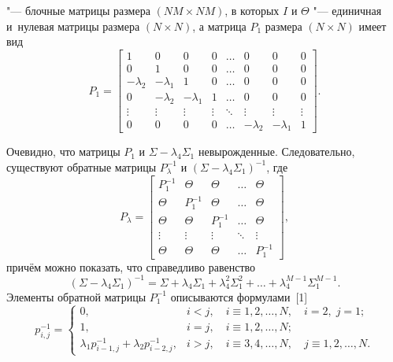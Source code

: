 "--- блочные матрицы размера $(NM{\times }NM)$, в которых $I$ и $\Theta$ "---
единичная и~нулевая матрицы размера $(N{\times} N)$, а матрица $P_1$ размера $(N{\times} N)$ имеет вид
\[
P_1= \begin{bmatrix}
1 & 0 & 0 & 0 & \ldots & 0 & 0 & 0 \\
0 & 1 & 0 & 0 & \ldots & 0 & 0 & 0\\
-\lambda_2 & -\lambda_1 & 1 & 0 & \ldots & 0 & 0 & 0 \\
0 & -\lambda_2 & -\lambda_1 & 1 & \ldots & 0 & 0 & 0\\
\vdots & \vdots & \vdots & \vdots & \ddots & \vdots & \vdots & \vdots\\
0 & 0 & 0 & 0 & \ldots & -\lambda_2 & -\lambda_1 & 1
\end{bmatrix}.
\]

Очевидно, что матрицы $P_1$ и $\Sigma-\lambda_4\Sigma_1$ невырожденные. Следовательно, существуют обратные матрицы $P_\lambda^{-1}$ и $(\Sigma-\lambda_4\Sigma_1)^{-1}$, где
\[
P_\lambda= \begin{bmatrix}
P_1^{-1} & \Theta & \Theta & \ldots & \Theta \\
\Theta & P_1^{-1} & \Theta & \ldots & \Theta\\
\Theta & \Theta & P_1^{-1} & \ldots & \Theta \\
\vdots & \vdots & \vdots & \ddots & \vdots\\
\Theta & \Theta & \Theta & \ldots & P_1^{-1}
\end{bmatrix},
\]
причём можно показать, что справедливо равенство $$(\Sigma-\lambda_4\Sigma_1)^{-1}=\Sigma+\lambda_4\Sigma_1+\lambda_4^{2}\Sigma_1^{2}+\ldots+\lambda_4^{M-1}\Sigma_1^{M-1}.$$ Элементы обратной матрицы $P_1^{-1}$ описываются формулами~[1]
\[ p_{i,j}^{-1}=\left\{
\begin{array}{cl}
0, & i<j, \quad i\equiv1, 2,\ldots,N, \quad i=2,\;j=1;\\
1, & i=j,\quad i\equiv1, 2,\ldots,N;\\
\lambda_1p_{i-1,j}^{-1}+\lambda_2p_{i-2,j}^{-1},& i>j, \quad i\equiv3, 4, \ldots,N, \quad j\equiv1, 2,\ldots,N.
\end{array}\right. \]

